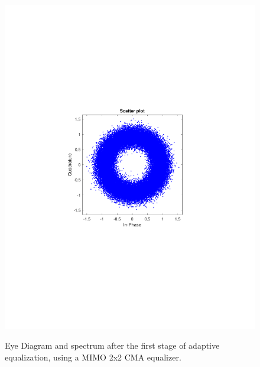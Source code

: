 \begin{refsection}
\begin{figure}[H]
\begin{minipage}{0.30\textwidth}
		\includegraphics[clip, trim=4cm 8cm 4cm 8cm, width=1\textwidth]{./sdf/m_qam_system/figures/expResults/intradyne/3_const_4GBdInSig13dB_AfMIMO1.pdf}
		\label{fig:4GBdSpecBefFec}
	\end{minipage}
	\caption{Eye Diagram and spectrum after the first stage of adaptive equalization, using a MIMO 2x2 CMA equalizer.}
\end{figure}


\end{refsection}
